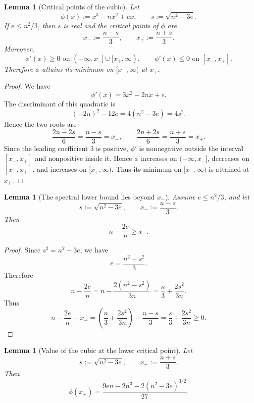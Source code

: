 \documentclass[11pt]{article}
\newtheorem{lemma}[theorem]{Lemma}
\begin{document}
\begin{lemma}[Critical points of the cubic]
\label{lem:cubic-critical-points}
Let
\[
        \phi(x):=x^3-nx^2+ex,
        \qquad
        s:=\sqrt{n^2-3e}.
\]
If \(e\le n^2/3\), then \(s\) is real and the critical points of \(\phi\) are
\[
        x_-:=\frac{n-s}{3},
        \qquad
        x_+:=\frac{n+s}{3}.
\]
Moreover,
\[
        \phi'(x)\ge 0 \text{ on }(-\infty,x_-]\cup[x_+,\infty),
        \qquad
        \phi'(x)\le 0 \text{ on }[x_-,x_+].
\]
Therefore \(\phi\) attains its minimum on \([x_-,\infty)\) at \(x_+\).
\end{lemma}

\begin{proof}
We have
\[
        \phi'(x)=3x^2-2nx+e.
\]
The discriminant of this quadratic is
\[
        (-2n)^2-12e=4(n^2-3e)=4s^2.
\]
Hence the two roots are
\[
        \frac{2n-2s}{6}=\frac{n-s}{3}=x_-,
        \qquad
        \frac{2n+2s}{6}=\frac{n+s}{3}=x_+.
\]
Since the leading coefficient \(3\) is positive, \(\phi'\) is nonnegative outside the
interval \([x_-,x_+]\) and nonpositive inside it.  Hence \(\phi\) increases on
\((-\infty,x_-]\), decreases on \([x_-,x_+]\), and increases on \([x_+,\infty)\).
Thus its minimum on \([x_-,\infty)\) is attained at \(x_+\).
\end{proof}

\begin{lemma}[The spectral lower bound lies beyond \(x_-\)]
\label{lem:spectral-beyond-xminus}
Assume \(e\le n^2/3\), and let
\[
        s:=\sqrt{n^2-3e},
        \qquad
        x_-:=\frac{n-s}{3}.
\]
Then
\[
        n-\frac{2e}{n}\ge x_-.
\]
\end{lemma}

\begin{proof}
Since \(s^2=n^2-3e\), we have
\[
        e=\frac{n^2-s^2}{3}.
\]
Therefore
\[
        n-\frac{2e}{n}
        =
        n-\frac{2(n^2-s^2)}{3n}
        =
        \frac{n}{3}+\frac{2s^2}{3n}.
\]
Thus
\[
        n-\frac{2e}{n}-x_-
        =
        \left(\frac{n}{3}+\frac{2s^2}{3n}\right)
        -
        \frac{n-s}{3}
        =
        \frac{s}{3}+\frac{2s^2}{3n}
        \ge 0.
\]
\end{proof}

\begin{lemma}[Value of the cubic at the lower critical point]
\label{lem:cubic-value}
Let
\[
        s:=\sqrt{n^2-3e},
        \qquad
        x_+:=\frac{n+s}{3}.
\]
Then
\[
        \phi(x_+)
        =
        \frac{9en-2n^3-2(n^2-3e)^{3/2}}{27}.
\]
\end{lemma}
\end{document}
